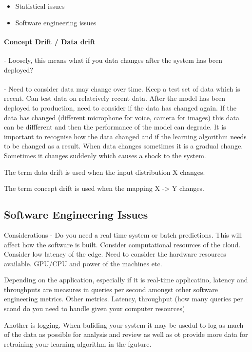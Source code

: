 \begin{itemize}
    \item Statistical issues
    \item Software engineering issues
\end{itemize}

\paragraph{Concept Drift / Data drift} - Loosely, this means what if you data changes after the system has been deployed?

\paragraph{} - Need to consider data may change over time.
Keep a test set of data which is recent. Can test data on relateively recent data.
After the model has been deployed to production, need to consider if the data has changed again.
If the data has changed (different microphone for voice, camera for images)  this data can be diffferent and then the performance of the model can degrade.
It is important to recognise how the data changed and if the learning algorithm needs to be changed as a result.
When data changes sometimes it is a gradual change.
Sometimes it changes suddenly which causes a shock to the system.

The term data drift is used when the input distribution X changes.

The term concept drift is used when the mapping X -> Y changes.

\subsection{Software Engineering Issues}

Considerations - Do you need a real time system or batch predictions. This will affect how the software is built.
Consider computational resources of the cloud. Consider low latency of the edge.
Need to consider the hardware resources available. GPU/CPU and power of the machines etc.

Depending on the application, especially if it is real-time applicatino, latency and throughputs are measures in queries per second amongst other software engineering metrics.
Other metrics. Latency, throughput (how many queries per scond do you need to handle given your computer resources)

Another is logging. When buliding your system it may be usedul to log as much of the data as possible for analysis and review as well as ot provide more data for retraining your learning algorithm in the fguture.

